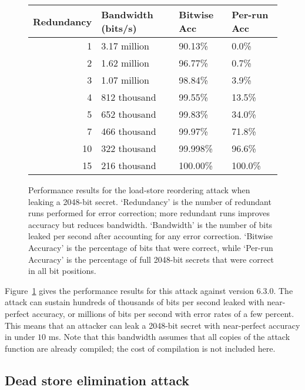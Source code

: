 \begin{figure}
  \small
  \begin{tabular}{ r | l | l | l }
    Redundancy & Bandwidth (bits/s) & Bitwise Acc & Per-run Acc \\ \hline
    1          & 3.17 million       & 90.13\%     & 0.0\%       \\
    2          & 1.62 million       & 96.77\%     & 0.7\%       \\
    3          & 1.07 million       & 98.84\%     & 3.9\%       \\
    4          & 812 thousand       & 99.55\%     & 13.5\%      \\
    5          & 652 thousand       & 99.83\%     & 34.0\%      \\
    7          & 466 thousand       & 99.97\%     & 71.8\%      \\
    10         & 322 thousand       & 99.998\%    & 96.6\%      \\
    15         & 216 thousand       & 100.00\%    & 100.0\%     \\
  \end{tabular}
  \caption{
    Performance results for the load-store reordering attack when leaking a
    2048-bit secret.
    `Redundancy' is the number of redundant runs performed for error
    correction; more redundant runs improves accuracy but reduces bandwidth.
    `Bandwidth' is the number of bits leaked per second after accounting for
    any error correction.
    `Bitwise Accuracy' is the percentage of bits that were correct, while
    `Per-run Accuracy' is the percentage of full 2048-bit secrets that were
    correct in all bit positions.
  }
  \label{fig:load-store-perf}
\end{figure}

Figure~\ref{fig:load-store-perf} gives the performance results for this attack
against {\GCC} version 6.3.0.
The attack can sustain hundreds of thousands of bits per second leaked with
near-perfect accuracy, or millions of bits per second with error rates of a
few percent.
This means that an attacker can leak a 2048-bit secret with near-perfect
accuracy in under $10$ ms.
Note that this bandwidth assumes that all copies of the attack function are
already compiled; the cost of compilation is not included here.

\subsection{Dead store elimination attack}
\label{subsec:exp-dse}

